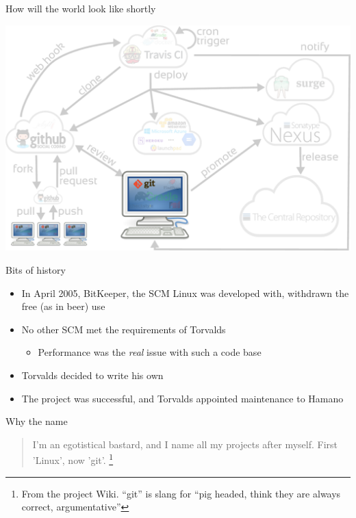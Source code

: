 \documentclass[presentation]{beamer}
\begin{document}
\begin{frame}[fragile]{How will the world look like shortly}
	\begin{center}
		\includegraphics[width=.9\textwidth]{images/ci-git}
	\end{center}
\end{frame}

\begin{frame}[fragile]{Bits of history}
	\begin{itemize}
		\item In April 2005, BitKeeper, the SCM Linux was developed with, withdrawn the free (as in beer) use
		\item No other SCM met the requirements of Torvalds
		\begin{itemize}
			\item Performance was the \textit{real} issue with such a code base
		\end{itemize}
		\item Torvalds decided to write his own
		\item The project was successful, and Torvalds appointed maintenance to Hamano
	\end{itemize}
	\begin{block}{Why the name}
		\begin{quote}
			I'm an egotistical bastard, and I name all my projects after myself. First 'Linux', now 'git'. \footnote{\tiny{From the project Wiki. ``git'' is slang for ``pig headed, think they are always correct, argumentative''}}
			\begin{flushright}
			\end{flushright}
		\end{quote}
	\end{block}
\end{frame}
\end{document}
